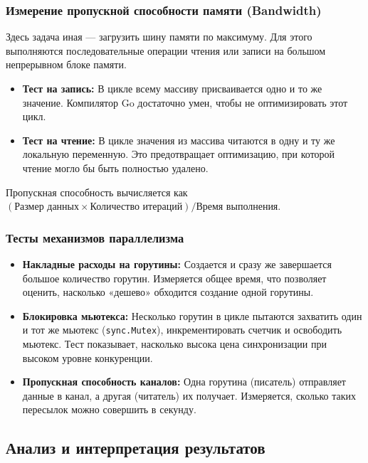 \subsubsection{Измерение пропускной способности памяти (Bandwidth)}

Здесь задача иная — загрузить шину памяти по максимуму. Для этого выполняются последовательные операции чтения или записи на большом непрерывном блоке памяти.

\begin{itemize}
    \item \textbf{Тест на запись:} В цикле всему массиву присваивается одно и то же значение. Компилятор Go достаточно умен, чтобы не оптимизировать этот цикл.
    \item \textbf{Тест на чтение:} В цикле значения из массива читаются в одну и ту же локальную переменную. Это предотвращает оптимизацию, при которой чтение могло бы быть полностью удалено.
\end{itemize}

Пропускная способность вычисляется как \( (\text{Размер данных} \times \text{Количество итераций}) / \text{Время выполнения} \).

\subsubsection{Тесты механизмов параллелизма}

\begin{itemize}
    \item \textbf{Накладные расходы на горутины:} Создается и сразу же завершается большое количество горутин. Измеряется общее время, что позволяет оценить, насколько «дешево» обходится создание одной горутины.
    \item \textbf{Блокировка мьютекса:} Несколько горутин в цикле пытаются захватить один и тот же мьютекс (\texttt{sync.Mutex}), инкрементировать счетчик и освободить мьютекс. Тест показывает, насколько высока цена синхронизации при высоком уровне конкуренции.
    \item \textbf{Пропускная способность каналов:} Одна горутина (писатель) отправляет данные в канал, а другая (читатель) их получает. Измеряется, сколько таких пересылок можно совершить в секунду.
\end{itemize}

\subsection{Анализ и интерпретация результатов}

